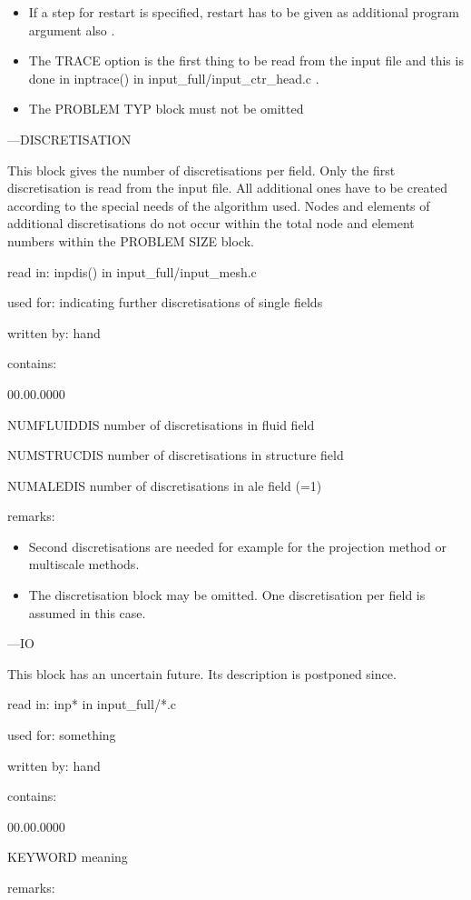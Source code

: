 \begin{itemize}
\item If a step for restart is specified, restart has to be given as additional
program argument also . 
\item The TRACE option is the first thing to be read from the input file
and this is done in inptrace() in input\_full/input\_ctr\_head.c . 
\item The PROBLEM TYP block must not be omitted
\end{itemize}
---DISCRETISATION 

This block gives the number of discretisations per field. Only the
first discretisation is read from the input file. All additional ones
have to be created according to the special needs of the algorithm
used. Nodes and elements of additional discretisations do not occur
within the total node and element numbers within the PROBLEM SIZE
block. 

read in: inpdis() in input\_full/input\_mesh.c 

used for: indicating further discretisations of single fields 

written by: hand 

contains: 

\begin{lyxlist}{00.00.0000}
\item [{NUMFLUIDDIS}] number of discretisations in fluid field 
\item [{NUMSTRUCDIS}] number of discretisations in structure field 
\item [{NUMALEDIS}] number of discretisations in ale field (=1) 
\end{lyxlist}
remarks: 

\begin{itemize}
\item Second discretisations are needed for example for the projection method
or multiscale methods. 
\item The discretisation block may be omitted. One discretisation per field
is assumed in this case.
\end{itemize}
---IO 

This block has an uncertain future. Its description is postponed since. 

read in: inp{*} in input\_full/{*}.c 

used for: something 

written by: hand 

contains: 

\begin{lyxlist}{00.00.0000}
\item [{KEYWORD}] meaning 
\end{lyxlist}
remarks: 

